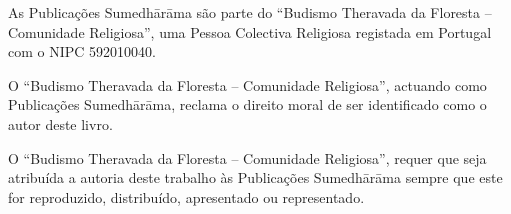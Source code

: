 {As Publicações Sumedhārāma são parte do ``Budismo Theravada da Floresta -- Comunidade Religiosa'', uma Pessoa Colectiva Religiosa registada em Portugal com o NIPC 592010040.

O ``Budismo Theravada da Floresta -- Comunidade Religiosa'', actuando como Publicações Sumedhārāma, reclama o direito moral de ser identiﬁcado como o autor deste livro.

O ``Budismo Theravada da Floresta -- Comunidade Religiosa'', requer que seja atribuída a autoria deste trabalho às Publicações Sumedhārāma sempre que este for reproduzido, distribuído, apresentado ou representado.

}
